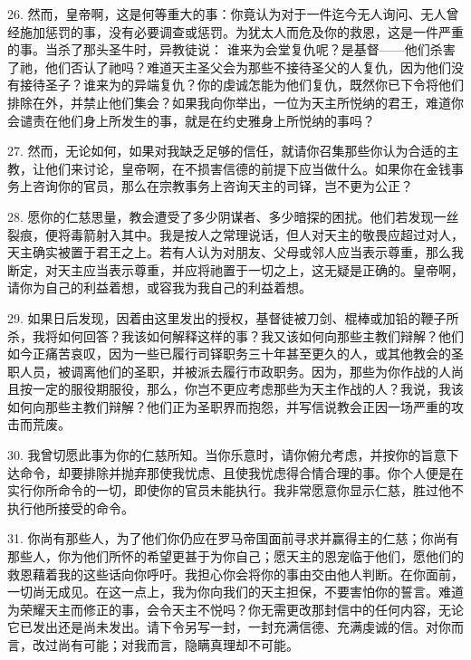 26. 然而，皇帝啊，这是何等重大的事：你竟认为对于一件迄今无人询问、无人曾经施加惩罚的事，没有必要调查或惩罚。为犹太人而危及你的救恩，这是一件严重的事。当杀了那头圣牛时，异教徒说： 谁来为会堂复仇呢？是基督——他们杀害了祂，他们否认了祂吗？难道天主圣父会为那些不接待圣父的人复仇，因为他们没有接待圣子？谁来为的异端复仇？你的虔诚怎能为他们复仇，既然你已下令将他们排除在外，并禁止他们集会？如果我向你举出，一位为天主所悦纳的君王，难道你会谴责在他们身上所发生的事，就是在约史雅身上所悦纳的事吗？\par

27. 然而，无论如何，如果对我缺乏足够的信任，就请你召集那些你认为合适的主教，让他们来讨论，皇帝啊，在不损害信德的前提下应当做什么。如果你在金钱事务上咨询你的官员，那么在宗教事务上咨询天主的司铎，岂不更为公正？\par

28. 愿你的仁慈思量，教会遭受了多少阴谋者、多少暗探的困扰。他们若发现一丝裂痕，便将毒箭射入其中。我是按人之常理说话，但人对天主的敬畏应超过对人，天主确实被置于君王之上。若有人认为对朋友、父母或邻人应当表示尊重，那么我断定，对天主应当表示尊重，并应将祂置于一切之上，这无疑是正确的。皇帝啊，请你为自己的利益着想，或容我为我自己的利益着想。\par

29. 如果日后发现，因着由这里发出的授权，基督徒被刀剑、棍棒或加铅的鞭子所杀，我将如何回答？我该如何解释这样的事？我又该如何向那些主教们辩解？他们如今正痛苦哀叹，因为一些已履行司铎职务三十年甚至更久的人，或其他教会的圣职人员，被调离他们的圣职，并被派去履行市政职务。因为，那些为你作战的人尚且按一定的服役期服役，那么，你岂不更应考虑那些为天主作战的人？我说，我该如何向那些主教们辩解？他们正为圣职界而抱怨，并写信说教会正因一场严重的攻击而荒废。\par

30. 我曾切愿此事为你的仁慈所知。当你乐意时，请你俯允考虑，并按你的旨意下达命令，却要排除并抛弃那使我忧虑、且使我忧虑得合情合理的事。你个人便是在实行你所命令的一切，即使你的官员未能执行。我非常愿意你显示仁慈，胜过他不执行他所接受的命令。\par

31. 你尚有那些人，为了他们你仍应在罗马帝国面前寻求并赢得主的仁慈；你尚有那些人，你为他们所怀的希望更甚于为你自己；愿天主的恩宠临于他们，愿他们的救恩藉着我的这些话向你呼吁。我担心你会将你的事由交由他人判断。在你面前，一切尚无成见。在这一点上，我为你向我们的天主担保，不要害怕你的誓言。难道为荣耀天主而修正的事，会令天主不悦吗？你无需更改那封信中的任何内容，无论它已发出还是尚未发出。请下令另写一封，一封充满信德、充满虔诚的信。对你而言，改过尚有可能；对我而言，隐瞒真理却不可能。\par

